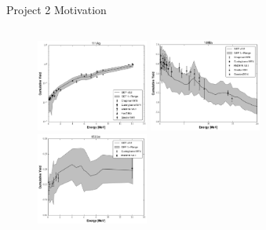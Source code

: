 \documentclass[xcolor=x11names,compress,handout]{beamer}
\renewcommand{\(}{\begin{columns}}
\renewcommand{\)}{\end{columns}}
\newcommand{\<}[1]{\begin{column}{#1}}
\renewcommand{\>}{\end{column}}
\begin{document}
\begin{frame}{Project 2 Motivation}
\begin{columns}
    \begin{column}{0.45\linewidth}
      \vspace{-0.55cm}
      \renewcommand*{\thesubfigure}{}
      \begin{figure}[htp]
        \centering
        \includegraphics[width=1.45in]{../figs/47_111_Ag_log.png}
        \vspace{-0.35cm}
        \includegraphics[width=1.45in]{../figs/56_140_Ba_lin.png}
        \vspace{-0.5cm}
        \includegraphics[width=1.45in]{../figs/62_153_Sm_lin.png}
      \end{figure}    
    \end{column}
  \end{columns}   
\end{frame}
\end{document}
